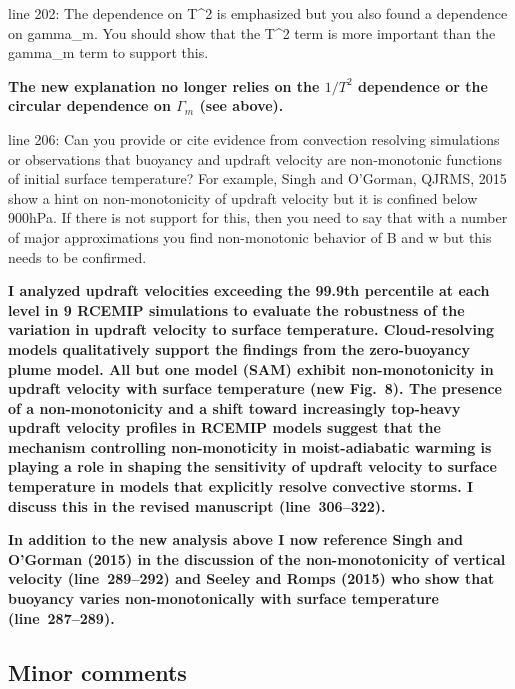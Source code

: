 \documentclass{article}
\begin{document}
\par
line 202: The dependence on T\^{}2 is emphasized but you also found a dependence on gamma\_m. You should show that the T\^{}2 term is more important than the gamma\_m term to support this.
\par
\textbf{The new explanation no longer relies on the $1/T^2$ dependence or the circular dependence on $\Gamma_m$ (see above).}
\par
line 206: Can you provide or cite evidence from convection resolving simulations or observations that buoyancy and updraft velocity are non-monotonic functions of initial surface temperature? For example, Singh and O'Gorman, QJRMS, 2015 show a hint on non-monotonicity of updraft velocity but it is confined below 900hPa. If there is not support for this, then you need to say that with a number of major approximations you find non-monotonic behavior of B and w but this needs to be confirmed.
\par
\textbf{I analyzed updraft velocities exceeding the 99.9th percentile at each level in 9 RCEMIP simulations to evaluate the robustness of the variation in updraft velocity to surface temperature. Cloud-resolving models qualitatively support the findings from the zero-buoyancy plume model. All but one model (SAM) exhibit non-monotonicity in updraft velocity with surface temperature (new Fig.~8). The presence of a non-monotonicity and a shift toward increasingly top-heavy updraft velocity profiles in RCEMIP models suggest that the mechanism controlling non-monoticity in moist-adiabatic warming is playing a role in shaping the sensitivity of updraft velocity to surface temperature in models that explicitly resolve convective storms. I discuss this in the revised manuscript (line~306--322).}
\par
\textbf{In addition to the new analysis above I now reference Singh and O'Gorman (2015) in the discussion of the non-monotonicity of vertical velocity (line~289--292) and Seeley and Romps (2015) who show that buoyancy varies non-monotonically with surface temperature (line~287--289).}

\subsection*{Minor comments}
\end{document}
